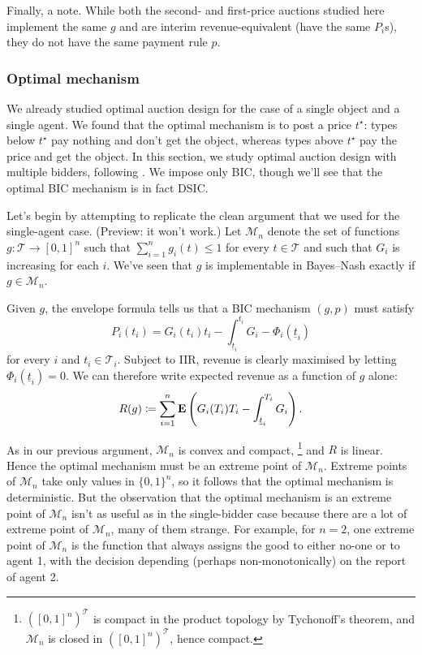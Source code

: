 \documentclass[11pt,letterpaper,reqno,oneside]{article}
\begin{document}
Finally, a note. While both the second- and first-price auctions studied here implement the same $g$ and are interim revenue-equivalent (have the same $P_i$s), they do not have the same payment rule $p$.



\subsubsection{Optimal mechanism}
\label{sec:mech_desi:several_agents_one_dimension:revenue-maxing_mech_mult}

We already studied optimal auction design for the case of a single object and a single agent. We found that the optimal mechanism is to post a price $t^\star$: types below $t^\star$ pay nothing and don't get the object, whereas types above $t^\star$ pay the price and get the object. In this section, we study optimal auction design with multiple bidders, following \textcite{Myerson1981}. We impose only BIC, though we'll see that the optimal BIC mechanism is in fact DSIC.

Let's begin by attempting to replicate the clean argument that we used for the single-agent case. (Preview: it won't work.) Let $\mathcal{M}_n$ denote the set of functions $g : \mathcal{T} \to [0,1]^n$ such that $\sum_{i=1}^n g_i(t) \leq 1$ for every $t \in \mathcal{T}$ and such that $G_i$ is increasing for each $i$. We've seen that $g$ is implementable in Bayes--Nash exactly if $g \in \mathcal{M}_n$.

Given $g$, the envelope formula tells us that a BIC mechanism $(g,p)$ must satisfy
%
\begin{equation*}
	P_i(t_i) 
	= G_i(t_i) t_i 
	- \int_{\underline{t}_i}^{t_i} G_i
	- \Phi_i( \underline{t}_i ) 
\end{equation*}
%
for every $i$ and $t_i \in \mathcal{T}_i$. Subject to IIR, revenue is clearly maximised by letting $\Phi_i(\underline{t}_i)=0$. We can therefore write expected revenue as a function of $g$ alone:
%
\begin{equation*}
	R(g) 
	\coloneqq \sum_{i=1}^n \mathbf{E}\left( 
	G_i(T_i) T_i - \int_{\underline{t}_i}^{T_i} G_i
	\right) .
\end{equation*}

As in our previous argument, $\mathcal{M}_n$ is convex and compact,%
	\footnote{$\left( [0,1]^n \right)^\mathcal{T}$ is compact in the product topology by Tychonoff's theorem, and $\mathcal{M}_n$ is closed in $\left( [0,1]^n \right)^\mathcal{T}$, hence compact.}
and $R$ is linear. Hence the optimal mechanism must be an extreme point of $\mathcal{M}_n$. Extreme points of $\mathcal{M}_n$ take only values in $\{0,1\}^n$, so it follows that the optimal mechanism is deterministic. But the observation that the optimal mechanism is an extreme point of $\mathcal{M}_n$ isn't as useful as in the single-bidder case because there are a lot of extreme point of $\mathcal{M}_n$, many of them strange. For example, for $n=2$, one extreme point of $\mathcal{M}_n$ is the function that always assigns the good to either no-one or to agent 1, with the decision depending (perhaps non-monotonically) on the report of agent 2.
\end{document}

